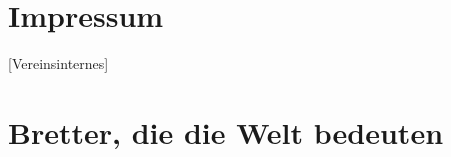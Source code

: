\documentclass[full]{dtk2}%
\begin{document}
\maketitle

\part{Impressum}


[Vereinsinternes]
\part{Bretter, die die Welt bedeuten}
 \clearpage
{}

\clearpage
\listofaddresses

\tableofcontents
\end{document}
